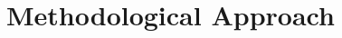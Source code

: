 \documentclass[12pt, notitlepage]{article}
\begin{document}
\section{Methodological Approach}
\end{document}
